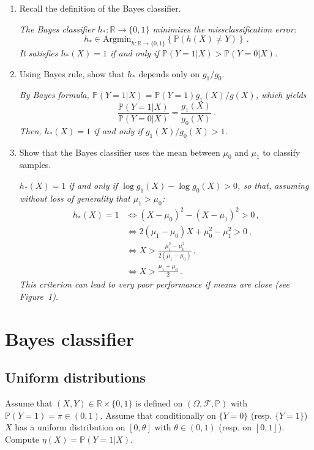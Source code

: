 \documentclass[a4paper,10pt,fleqn]{article}
\newcommand{\eqsp}{\,}
\newcommand{\rset}{\ensuremath{\mathbb{R}}}
\newcommand{\bP}{\mathbb{P}}
\newcommand{\1}{\ensuremath{\mathbbm{1}}}
\begin{document}
\begin{enumerate}
\item Recall the definition of the Bayes classifier.

\vspace{.2cm}

{\em The Bayes classifier $h_*: \mathbb{R}\to \{0,1\}$ minimizes the missclassification error:
$$
h_{*} \in \mathrm{Argmin}_{h:\rset\to \{0,1\}}\left\{\bP(h(X)\neq Y)\right\}\eqsp.
$$
It satisfies $h_{*}(X) = 1$ if and only if $\bP(Y=1|X)> \bP(Y=0|X)$.}

\item Using Bayes rule, show that  $h_*$ depends only on $g_1/g_0$.

\vspace{.2cm}

{\em  By Bayes formula, $\bP(Y=1|X) = \bP(Y=1)g_1(X)/g(X)$, which yields
$$
\frac{\bP(Y=1|X)}{\bP(Y=0|X)} = \frac{g_1(X)}{g_0(X)}\eqsp.
$$
Then, $h_*(X) = 1$ if and only if $g_1(X)/g_0(X)>1$.
}

\item Show that the Bayes classifier uses the mean between  $\mu_0$ and  $\mu_1$ to classify samples.

\vspace{.2cm}

{\em $h_*(X) = 1$ if and only if  $\log g_1(X) - \log g_0(X)>0$, so that, assuming without loss of generality that $\mu_1>\mu_0$:
\begin{align*}
h_*(X) = 1 & \Leftrightarrow (X-\mu_0)^2 - (X-\mu_1)^2>0\,,\\
& \Leftrightarrow 2 (\mu_1-\mu_0)X + \mu_0^2 - \mu_1^2>0\,,\\
&\Leftrightarrow X> \frac{\mu_1^2 - \mu_0^2}{2(\mu_1-\mu_0)}\,,\\
& \Leftrightarrow X> \frac{\mu_1 + \mu_0}{2}\eqsp.
\end{align*}
This criterion can lead to very poor performance if means are close (see Figure~1).}
\end{enumerate}



\section{Bayes classifier}
\subsection{Uniform distributions}
Assume that $(X,Y)\in\mathbb{R}\times\{0,1\}$ is defined on $(\Omega,\mathcal{F},\mathbb{P})$ with $\mathbb{P}(Y=1) = \pi \in(0,1)$.  Assume that conditionally on $\{Y=0\}$ (resp. $\{Y=1\}$) $X$ has a uniform distribution on $[0,\theta]$ with $\theta\in(0,1)$ (resp. on $[0,1]$). Compute $\eta(X) = \mathbb{P}(Y=1 |X)$.
\end{document}
